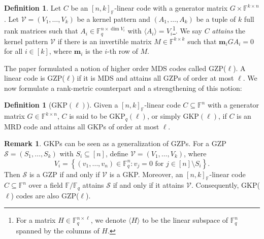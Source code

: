 \documentclass[11pt]{article}
\newif\ifmynotes
\newcommand{\ZGnote}[1]{\ifmynotes\textcolor{purple}{[Zeyu: #1]}\else\fi}
\newcommand{\CYnote}[1]{\ifmynotes\textcolor{orange}{[Chen: #1]}\else\fi}
\newcommand{\ZZnote}[1]{\ifmynotes\textcolor{violet}{[Zihan: #1]}\else\fi}
\theoremstyle{plain}
\theoremstyle{definition}
\newtheorem{rmka}[thm]{Remark}
\newtheorem{defn}[thm]{Definition}
\theoremstyle{remark}
\newcommand{\F}{\mathbb{F}}
\newcommand{\vm}{\bm{m}}
\begin{document}
\begin{defn}
Let $C$ be an $[n,k]_{\F}$-linear code with a generator matrix $G\times \F^{k\times n}$.
Let $\mathcal{V}=(V_1,\ldots,V_k)$ be a kernel pattern and $(A_1,\ldots,A_k)$ be a tuple of $k$ full rank matrices such that $A_i\in\F_q^{n\times \dim V_i}$ with $\langle A_i\rangle=V_i$\footnote{For a matrix $H\in\F_q^{n\times \ell}$, we denote $\langle H\rangle$ to be the linear subspace of $\F_q^n$ spanned by the columns of $H$.}. %
We say $C$ \emph{attains} the kernel pattern $\mathcal{V}$ if there is an invertible matrix $M\in\F^{k\times k}$ such that $\vm_i GA_i=0$ for all $i\in[k]$, where $\vm_i$ is the $i$-th row of $M$. 
\end{defn}
The paper \cite{brakensiek2023generic} formulated a notion of higher order MDS codes called GZP($\ell$). A linear code is GZP($\ell$) if it is MDS and attains all GZPs of order at most $\ell$.
We now formulate a rank-metric counterpart and a strengthening of this notion:
\begin{defn}[$\mathrm{GKP}(\ell)$]\label{olkernel1}
Given a $[n,k]_{\F}$-linear code $C\subseteq\F^n$ with a generator matrix $G\in\F^{k\times n}$, $C$ is said to be $\mathrm{GKP}_q(\ell)$, or simply $\mathrm{GKP}(\ell)$, if $C$ is an MRD code and attains all GKPs of order at most $\ell$. %
\end{defn}
\begin{rmka}\label{rmk:GZP}
GKPs can be seen as a generalization of GZPs. For a GZP $\mathcal{S}=(S_1,\ldots,S_k)$ with $S_i\subseteq [n]$, define $\mathcal{V}=(V_1,\dots,V_k)$, where
\[
V_i=\left\{(v_1,\dots,v_n)\in \F_q^n: v_j=0\text{ for }j\in [n]\setminus S_i\right\}.
\] 
Then $\mathcal{S}$ is a GZP if and only if $\mathcal{V}$ is a GKP. Moreover, an $[n,k]_{\F}$-linear code $C\subseteq\F^n$ over a field $\F/\F_q$ attains $\mathcal{S}$ if and only if it attains $\mathcal{V}$. Consequently, GKP($\ell$) codes are also GZP($\ell$).
\end{rmka}
\end{document}

